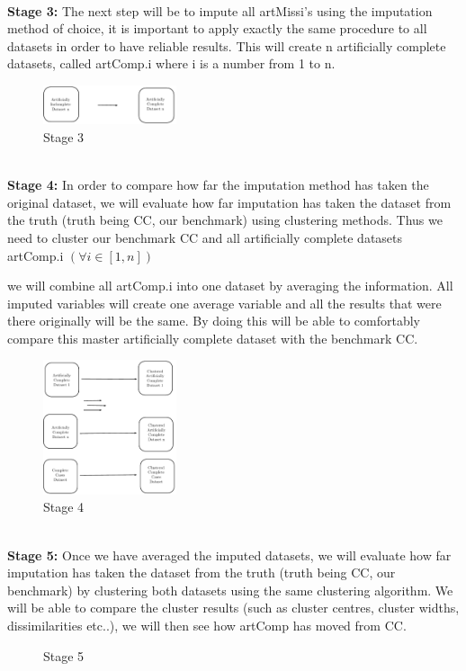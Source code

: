 \documentclass{IEEEconf}
\begin{document}
		\\
		\indent \textbf{Stage 3:}
		The next step will be to impute all artMissi's using the imputation method of choice, it is important to apply exactly the same procedure to all datasets in order to have reliable results. This will create n artificially complete datasets, called artComp.i where i is a number from 1 to n. 
		\begin{figure}[!ht]
			\caption{Stage 3}
			\centering
			\includegraphics[width=0.35\textwidth]{stage34.pdf}
		\end{figure}
		\\
		\indent \textbf{Stage 4:}
		In order to compare how far the imputation method has taken the original dataset, we will evaluate how far imputation has taken the dataset from the truth (truth being CC, our benchmark) using clustering methods. Thus we need to cluster our benchmark CC and all artificially complete datasets artComp.i $(\forall i \in [1,n]) $

		we will combine all artComp.i into one dataset by averaging the information. All imputed variables will create one average variable and all the results that were there originally will be the same. By doing this will be able to comfortably compare this master artificially complete dataset with the benchmark CC. 
		\begin{figure}[!ht]
			\caption{Stage 4}
			\centering
			\includegraphics[width=0.35\textwidth]{stage5.pdf}
		\end{figure}
		\\
		\indent \textbf{Stage 5:}
		Once we have averaged the imputed datasets, we will evaluate how far imputation has taken the dataset from the truth (truth being CC, our benchmark) by clustering both datasets using the same clustering algorithm. We will be able to compare the cluster results (such as cluster centres, cluster widths, dissimilarities etc..), we will then see how artComp has moved from CC. 
		\begin{figure}[!ht]
			\caption{Stage 5}
			\centering
		\end{figure}
		\\
\end{document}
